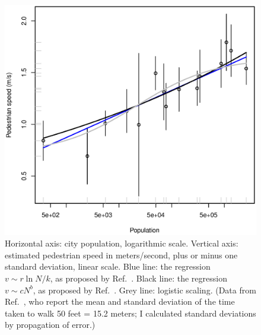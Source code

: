 \documentclass{pnastwo}
\begin{document}
\begin{figure}
\includegraphics[width=\columnwidth]{pace-of-life}
\caption{Horizontal axis: city population, logarithmic scale.  Vertical axis:
  estimated pedestrian speed in meters/second, plus or minus one standard
  deviation, linear scale.  Blue line: the regression $v \sim r\ln{N/k}$, as
  proposed by Ref.\ \cite{Bornstein-Bornstein-pace-of-life}.  Black line: the
  regression $v \sim c N^b$, as proposed by Ref.\
  \cite{Bettencout-et-al-growth-innovation-scaling}.  Grey line: logistic
  scaling.  (Data from Ref.\ \cite{Bornstein-Bornstein-pace-of-life}, who
  report the mean and standard deviation of the time taken to walk 50 feet =
  15.2 meters; I calculated standard deviations by propagation of error.)}
\label{fig:pace-of-life}
\end{figure}
\end{document}
